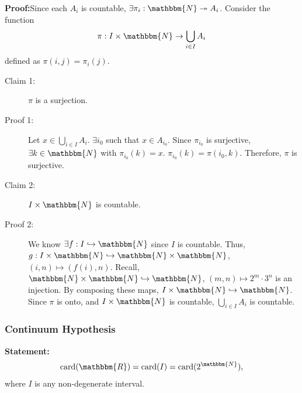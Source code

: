 \documentclass[10pt]{extarticle}
\newcommand{\card}{\text{card}}
\newcommand{\N}{\mathbbm{N}}
\newcommand{\R}{\mathbbm{R}}
\begin{document}
    \textbf{Proof:}Since each $A_i$ is countable, $\exists \pi_i: \N \twoheadrightarrow A_i$. Consider the function
      \[
        \pi: I\times\N \rightarrow \bigcup_{i\in I}A_i
      \] 
      defined as $\pi(i,j) = \pi_i(j)$.
      \begin{description}
        \item[Claim 1:] $\pi$ is a surjection.
        \item[Proof 1:] Let $x\in \bigcup_{i\in I}A_i$. $\exists i_0$ such that $x\in A_{i_0}$. Since $\pi_{i_0}$ is surjective, $\exists k\in \N$ with $\pi_{i_0}(k) = x$. $\pi_{i_0}(k) = \pi(i_0,k)$. Therefore, $\pi$ is surjective.
        \item[Claim 2:] $I\times\N$ is countable.
        \item[Proof 2:] We know $\exists f: I\hookrightarrow\N$ since $I$ is countable. Thus, $g:I\times\N\hookrightarrow\N\times\N$, $(i,n)\mapsto (f(i),n)$. Recall, $\N\times\N\hookrightarrow \N$, $(m,n)\mapsto 2^m\cdot3^n$ is an injection. By composing these maps, $I\times\N\hookrightarrow\N$. Since $\pi$ is onto, and $I\times\N$ is countable, $\bigcup_{i\in I} A_i$ is countable.
      \end{description}
      \subsubsection{Continuum Hypothesis}%
      \textbf{Statement:}
      \begin{align*}
        \card(\R) = \card(I) = \card(2^{\N}), 
      \end{align*}
      where $I$ is any non-degenerate interval.\\
\end{document}
